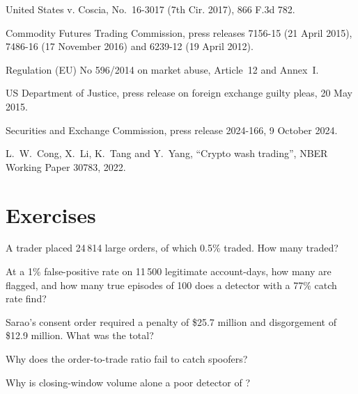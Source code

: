 \begin{omsources}
\item United States v. Coscia, No.~16-3017 (7th Cir. 2017), 866 F.3d 782.
\item Commodity Futures Trading Commission, press releases 7156-15 (21 April 2015), 7486-16 (17 November 2016) and 6239-12 (19 April 2012).
\item Regulation (EU) No 596/2014 on market abuse, Article~12 and Annex~I.
\item US Department of Justice, press release on foreign exchange guilty pleas, 20 May 2015.
\item Securities and Exchange Commission, press release 2024-166, 9 October 2024.
\item L.~W.~Cong, X.~Li, K.~Tang and Y.~Yang, ``Crypto wash trading'', NBER Working Paper 30783, 2022.
\end{omsources}

\section{Exercises}

\begin{exercise}[$\star$]\label{exo:s2:manipulative-strategies-and-how-they-are-caught:1}
A trader placed 24\,814 large orders, of which 0.5\% traded. How many traded?
\end{exercise}

\begin{exercise}[$\star$]\label{exo:s2:manipulative-strategies-and-how-they-are-caught:2}
At a 1\% false-positive rate on 11\,500 legitimate account-days, how many are flagged, and how many true episodes of 100 does a detector with a 77\%
catch rate find?
\end{exercise}

\begin{exercise}[$\star$]\label{exo:s2:manipulative-strategies-and-how-they-are-caught:3}
Sarao's consent order required a penalty of \$25.7 million and disgorgement of \$12.9 million. What was the total?
\end{exercise}

\begin{exercise}[$\star\star$]\label{exo:s2:manipulative-strategies-and-how-they-are-caught:4}
Why does the order-to-trade ratio fail to catch spoofers?
\end{exercise}

\begin{exercise}[$\star\star$]\label{exo:s2:manipulative-strategies-and-how-they-are-caught:5}
Why is closing-window volume alone a poor detector of ?
\end{exercise}

